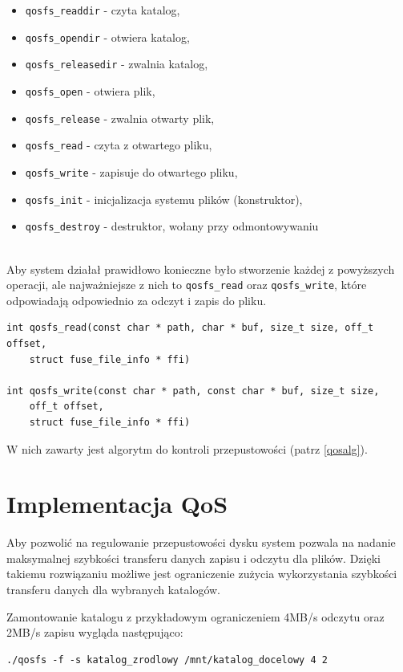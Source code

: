 \begin{itemize}
\item \texttt{qosfs\_readdir} - czyta katalog,
\item \texttt{qosfs\_opendir} - otwiera katalog,
\item \texttt{qosfs\_releasedir} - zwalnia katalog,
\item \texttt{qosfs\_open} - otwiera plik,
\item \texttt{qosfs\_release} - zwalnia otwarty plik,
\item \texttt{qosfs\_read} - czyta z otwartego pliku,
\item \texttt{qosfs\_write} - zapisuje do otwartego pliku,
\item \texttt{qosfs\_init} - inicjalizacja systemu plików (konstruktor),
\item \texttt{qosfs\_destroy} - destruktor, wołany przy odmontowywaniu 
\end{itemize}
\ \\

Aby system działał prawidłowo konieczne było stworzenie każdej z powyższych operacji, ale 
najważniejsze z nich to \texttt{qosfs\_read} oraz \texttt{qosfs\_write}, które odpowiadają
odpowiednio za odczyt i zapis do pliku. 

\begingroup\singlespacing
\begin{verbatim}
int qosfs_read(const char * path, char * buf, size_t size, off_t offset, 
    struct fuse_file_info * ffi)

int qosfs_write(const char * path, const char * buf, size_t size, 
    off_t offset,
    struct fuse_file_info * ffi)
\end{verbatim}
\endgroup

W nich zawarty jest algorytm do kontroli przepustowości (patrz \ref{qosalg}).

\section{Implementacja QoS}\label{qosimpl}

Aby pozwolić na regulowanie przepustowości dysku system pozwala na nadanie maksymalnej 
szybkości transferu danych zapisu i odczytu dla plików. Dzięki takiemu rozwiązaniu możliwe jest
ograniczenie zużycia wykorzystania szybkości transferu danych dla wybranych katalogów.

Zamontowanie katalogu z przykładowym ograniczeniem 4MB/s odczytu oraz 2MB/s zapisu wygląda następująco:

\begin{verbatim}
./qosfs -f -s katalog_zrodlowy /mnt/katalog_docelowy 4 2
\end{verbatim}

